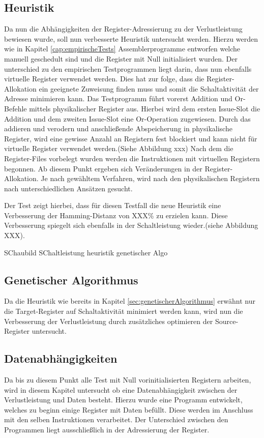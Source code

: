 \subsection{Heuristik} 
Da nun die Abhängigkeiten der Register-Adressierung zu der Verlustleistung bewiesen wurde, soll nun verbesserte Heuristik untersucht werden. Hierzu werden wie in Kapitel \ref{cap:empirischeTests} Assemblerprogramme entworfen welche manuell geschedult sind und die Register mit Null initialisiert wurden. Der unterschied zu den empirischen Testprogrammen liegt darin, dass nun ebenfalls virtuelle Register verwendet werden.
Dies hat zur folge, dass die Register-Allokation ein geeignete Zuweisung finden muss und somit die Schaltaktivität der Adresse minimieren kann. Das Testprogramm führt vorerst Addition und Or-Befehle mittels physikalischer Register aus. Hierbei wird dem ersten Issue-Slot die Addition und dem zweiten Issue-Slot eine Or-Operation zugewiesen. Durch das addieren und verodern und anschließende Abspeicherung in physikalische Register, wird eine gewisse Anzahl an Registern fest blockiert und kann nicht für virtuelle Register verwendet werden.(Siehe Abbildung xxx)
Nach dem die Register-Files vorbelegt wurden werden die Instruktionen mit virtuellen Registern begonnen. Ab diesem Punkt ergeben sich Veränderungen in der Register-Allokation. Je nach gewähltem Verfahren, wird nach den physikalischen Registern nach unterschiedlichen Ansätzen gesucht. 

Der Test zeigt hierbei, dass für diesen Testfall die neue Heuristik eine Verbesserung der Hamming-Distanz von XXX\% zu erzielen kann. Diese Verbesserung spiegelt sich ebenfalls in der Schaltleistung wieder.(siehe Abbildung XXX).

SChaubild SChaltleistung heuristik genetischer Algo

\subsection{Genetischer Algorithmus}
Da die Heuristik wie bereits in Kapitel \ref{sec:genetischerAlgorithmus} erwähnt nur die Target-Register auf Schaltaktivität minimiert werden kann, wird nun die Verbesserung der Verlustleistung durch zusätzliches optimieren der Source-Register untersucht. 

\subsection{Datenabhängigkeiten}
Da bis zu diesem Punkt alle Test mit Null vorinitialisierten Registern arbeiten, wird in diesem Kapitel untersucht ob eine Datenabhängigkeit zwischen der Verlustleistung und Daten besteht. Hierzu wurde eine Programm entwickelt, welches zu beginn einige Register mit Daten befüllt. Diese werden im Anschluss mit den selben Instruktionen verarbeitet. Der Unterschied zwischen den Programmen liegt ausschließlich in der Adressierung der Register.  

